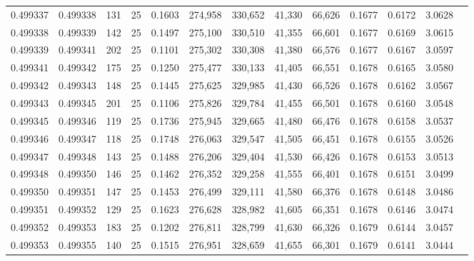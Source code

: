 \begin{tabular}{rrrrrrrrrrrrr}
0.499337 & 0.499338 & 131 &  25 &                                     0.1603 & 274,958 & 330,652 &  41,330 &  66,626 & 0.1677 & 0.6172 & 3.0628 \\
0.499338 & 0.499339 & 142 &  25 &                                     0.1497 & 275,100 & 330,510 &  41,355 &  66,601 & 0.1677 & 0.6169 & 3.0615 \\
0.499339 & 0.499341 & 202 &  25 &                                     0.1101 & 275,302 & 330,308 &  41,380 &  66,576 & 0.1677 & 0.6167 & 3.0597 \\
0.499341 & 0.499342 & 175 &  25 &                                     0.1250 & 275,477 & 330,133 &  41,405 &  66,551 & 0.1678 & 0.6165 & 3.0580 \\
0.499342 & 0.499343 & 148 &  25 &                                     0.1445 & 275,625 & 329,985 &  41,430 &  66,526 & 0.1678 & 0.6162 & 3.0567 \\
0.499343 & 0.499345 & 201 &  25 &                                     0.1106 & 275,826 & 329,784 &  41,455 &  66,501 & 0.1678 & 0.6160 & 3.0548 \\
0.499345 & 0.499346 & 119 &  25 &                                     0.1736 & 275,945 & 329,665 &  41,480 &  66,476 & 0.1678 & 0.6158 & 3.0537 \\
0.499346 & 0.499347 & 118 &  25 &                                     0.1748 & 276,063 & 329,547 &  41,505 &  66,451 & 0.1678 & 0.6155 & 3.0526 \\
0.499347 & 0.499348 & 143 &  25 &                                     0.1488 & 276,206 & 329,404 &  41,530 &  66,426 & 0.1678 & 0.6153 & 3.0513 \\
0.499348 & 0.499350 & 146 &  25 &                                     0.1462 & 276,352 & 329,258 &  41,555 &  66,401 & 0.1678 & 0.6151 & 3.0499 \\
0.499350 & 0.499351 & 147 &  25 &                                     0.1453 & 276,499 & 329,111 &  41,580 &  66,376 & 0.1678 & 0.6148 & 3.0486 \\
0.499351 & 0.499352 & 129 &  25 &                                     0.1623 & 276,628 & 328,982 &  41,605 &  66,351 & 0.1678 & 0.6146 & 3.0474 \\
0.499352 & 0.499353 & 183 &  25 &                                     0.1202 & 276,811 & 328,799 &  41,630 &  66,326 & 0.1679 & 0.6144 & 3.0457 \\
0.499353 & 0.499355 & 140 &  25 &                                     0.1515 & 276,951 & 328,659 &  41,655 &  66,301 & 0.1679 & 0.6141 & 3.0444 \\

\end{tabular}
